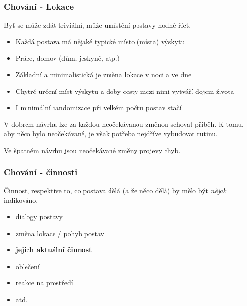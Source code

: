 ﻿\documentclass[a4paper]{beamer}
\def\uv#1{\char92\relax #1\char34\relax}
\begin{document}
\begin{frame}
\frametitle{Chování - Lokace}

Byť se může zdát triviální, může umístění postavy hodně říct.

 \begin{itemize}
     \item Každá postava má nějaké \uv{typické} místo (místa) výskytu
     \item Práce, domov (dům, jeskyně, atp.)
     \item Základní a minimalistická je změna lokace v noci a ve dne
     \item Chytré určení míst výskytu a doby cesty mezi nimi vytváří dojem života       
     \item I minimální randomizace při velkém počtu postav stačí 
 \end{itemize}
 
  \vfill
 
 V dobrém návrhu lze za každou neočekávanou změnou \uv{schovat} příběh. 
 K tomu, aby něco bylo neočekávané, je však potřeba nejdříve vybudovat \uv{rutinu}. 
 
 \vfill
 Ve špatném návrhu jsou neočekávané změny projevy chyb. 



\end{frame}


\begin{frame}
\frametitle{Chování - činnosti}

Činnost, respektive to, co postava dělá (a že něco dělá) by mělo být \emph{nějak} indikováno.
 \vfill

  \begin{itemize} 
      \item dialogy postavy
      \item změna lokace / pohyb postav
      \item \textbf{jejich aktuální činnost}
      \item oblečení
      \item reakce na prostředí
      \item atd.
  \end{itemize}
\end{frame}
\end{document}
